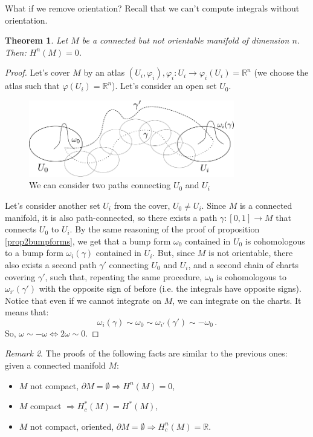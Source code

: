 \documentclass[a4paper,11pt,titlepage, article, oneside]{memoir}
\numberwithin{equation}{section}
\newtheorem{theorem}{Theorem}[section]
\theoremstyle{definition}
\theoremstyle{remark}
\newtheorem{remark}[theorem]{Remark}
\newcommand{\rfield}{\mathbb{R}}
\begin{document}
What if we remove orientation? Recall that we can't compute integrals without orientation.
\begin{theorem}
Let $M$ be a connected but not orientable manifold of dimension $n$. Then: $H^n(M) = 0$.
\end{theorem}
\begin{proof}
Let's cover $M$ by an atlas $(U_i, \varphi_i), \varphi_i \colon U_i \rightarrow \varphi_i(U_i) = \rfield^n$ (we choose the atlas such that $\varphi(U_i) = \rfield^n$). Let's consider an open set $U_0$.
\begin{figure}[H] \label{Fig:bumpforms3}
     \centering
     \includegraphics[width=0.8\textwidth]{Images/bumpforms3.pdf} 
     \caption{We can consider two paths connecting $U_0$ and $U_i$}      
\end{figure}
Let's consider another set $U_i$ from the cover, $U_0 \not = U_i$. Since $M$ is a connected manifold, it is also path-connected, so there exists a path $\gamma \colon [0, 1] \rightarrow M$ that connects $U_0$ to $U_i$. By the same reasoning of the proof of proposition \ref{prop2bumpforms}, we get that a bump form $\omega_0$ contained  in $U_0$ is cohomologous to a bump form $\omega_i(\gamma)$ contained in $U_i$. But, since $M$ is not orientable, there also exists a second path $\gamma'$ connecting $U_0$ and $U_i$, and a second chain of charts covering $\gamma'$, such that, repeating the same procedure, $\omega_0$ is cohomologous to $\omega_{i'}(\gamma')$ with the opposite sign of before (i.e. the integrals have opposite signs). Notice that even if we cannot integrate on $M$, we can integrate on the charts. It means that:
\[ \omega_i(\gamma) \sim \omega_0 \sim \omega_{i'}(\gamma') \sim -\omega_0 \, . \]
So, $\omega \sim - \omega \Leftrightarrow 2 \omega \sim 0$.
\end{proof}

\begin{remarkbox}\begin{remark}
The proofs of the following facts are similar to the previous ones: given a connected manifold $M$:
\begin{itemize}
\item $M$ not compact, $\partial M = \emptyset \Rightarrow H^n(M)=0$,
\item $M$ compact $\Rightarrow H_c^*(M) = H^*(M)$,
\item $M$ not compact, oriented, $\partial M= \emptyset \Rightarrow H^n_c(M)=\rfield$. 
\end{itemize}
\end{remark}\end{remarkbox}
\end{document}
